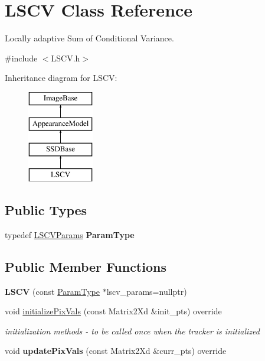 \hypertarget{classLSCV}{\section{L\-S\-C\-V Class Reference}
\label{classLSCV}
}


Locally adaptive Sum of Conditional Variance.  




{\ttfamily \#include $<$L\-S\-C\-V.\-h$>$}

Inheritance diagram for L\-S\-C\-V\-:\begin{figure}[H]
\begin{center}
\leavevmode
\includegraphics[height=4.000000cm]{classLSCV}
\end{center}
\end{figure}
\subsection*{Public Types}
\begin{DoxyCompactItemize}
\item 
\hypertarget{classLSCV_abed517d416096f35f3c43e7882669d94}{typedef \hyperlink{structLSCVParams}{L\-S\-C\-V\-Params} {\bfseries Param\-Type}}\label{classLSCV_abed517d416096f35f3c43e7882669d94}

\end{DoxyCompactItemize}
\subsection*{Public Member Functions}
\begin{DoxyCompactItemize}
\item 
\hypertarget{classLSCV_af0b4e38f1845933082585dfcbdf27418}{{\bfseries L\-S\-C\-V} (const \hyperlink{structLSCVParams}{Param\-Type} $\ast$lscv\-\_\-params=nullptr)}\label{classLSCV_af0b4e38f1845933082585dfcbdf27418}

\item 
\hypertarget{classLSCV_a041890dd44227948a40f4d365a75e6e3}{void \hyperlink{classLSCV_a041890dd44227948a40f4d365a75e6e3}{initialize\-Pix\-Vals} (const Matrix2\-Xd \&init\-\_\-pts) override}\label{classLSCV_a041890dd44227948a40f4d365a75e6e3}

\begin{DoxyCompactList}\small\item\em initialization methods -\/ to be called once when the tracker is initialized \end{DoxyCompactList}\item 
\hypertarget{classLSCV_adece8c85e44791d391ca3e09507ca0e2}{void {\bfseries update\-Pix\-Vals} (const Matrix2\-Xd \&curr\-\_\-pts) override}\label{classLSCV_adece8c85e44791d391ca3e09507ca0e2}

\end{DoxyCompactItemize}
